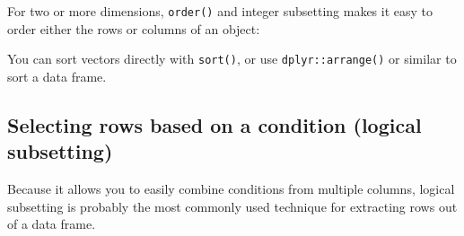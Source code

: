 \documentclass[]{book}
\newenvironment{Shaded}{\begin{snugshade}}{\end{snugshade}}
\newcommand{\CommentTok}[1]{\textcolor[rgb]{0.56,0.35,0.01}{\textit{#1}}}
\newcommand{\DataTypeTok}[1]{\textcolor[rgb]{0.13,0.29,0.53}{#1}}
\newcommand{\DecValTok}[1]{\textcolor[rgb]{0.00,0.00,0.81}{#1}}
\newcommand{\KeywordTok}[1]{\textcolor[rgb]{0.13,0.29,0.53}{\textbf{#1}}}
\newcommand{\NormalTok}[1]{#1}
\newcommand{\OperatorTok}[1]{\textcolor[rgb]{0.81,0.36,0.00}{\textbf{#1}}}
\newcommand{\StringTok}[1]{\textcolor[rgb]{0.31,0.60,0.02}{#1}}
\theoremstyle{definition}
\theoremstyle{definition}
\theoremstyle{definition}
\theoremstyle{remark}
\begin{document}
For two or more dimensions, \texttt{order()} and integer subsetting
makes it easy to order either the rows or columns of an object:

\begin{Shaded}
\end{Shaded}

You can sort vectors directly with \texttt{sort()}, or use
\texttt{dplyr::arrange()} or similar to sort a data frame.

\hypertarget{selecting-rows-based-on-a-condition-logical-subsetting}{%
\subsection{Selecting rows based on a condition (logical
subsetting)}\label{selecting-rows-based-on-a-condition-logical-subsetting}}

Because it allows you to easily combine conditions from multiple
columns, logical subsetting is probably the most commonly used technique
for extracting rows out of a data frame.
\end{document}
